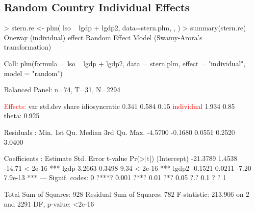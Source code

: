 \documentclass[landscape,letterpaper,9pt]{article}
\begin{document}
\clearpage
\newpage
\subsection{Random Country Individual Effects}
\begin{CVerbatim}
> stern.re <- plm( lso ~ lgdp  + lgdp2, 
           data=stern.plm,  \fbox{\textcolor{red}{model="random"}}, \fbox{\textcolor{red}{effect = "individual"}})
> summary(stern.re)
Oneway (individual) effect Random Effect Model
   (Swamy-Arora's transformation)

Call:
plm(formula = lso ~ lgdp + lgdp2, data = stern.plm, effect = "individual",
    model = "random")

Balanced Panel: n=74, T=31, N=2294

\textcolor{red}{Effects:}
                var std.dev share
idiosyncratic 0.341   0.584  0.15
\textcolor{red}{individual}    1.934   \fbox{\textcolor{red}{1.391}}  0.85
theta:  0.925

Residuals :
   Min. 1st Qu.  Median 3rd Qu.    Max.
-4.5700 -0.1680  0.0551  0.2520  3.0400

Coefficients :
            Estimate Std. Error t-value Pr(>|t|)
(Intercept) -21.3789     1.4538  -14.71  < 2e-16 ***
lgdp          3.2663     0.3498    9.34  < 2e-16 ***
lgdp2        -0.1521     0.0211   -7.20  7.9e-13 ***
---
Signif. codes:  0 ?***? 0.001 ?**? 0.01 ?*? 0.05 ?.? 0.1 ? ? 1

Total Sum of Squares:    928
Residual Sum of Squares: 782
F-statistic: 213.906 on 2 and 2291 DF, p-value: <2e-16
\end{CVerbatim}

\newpage
\clearpage
\end{document}
